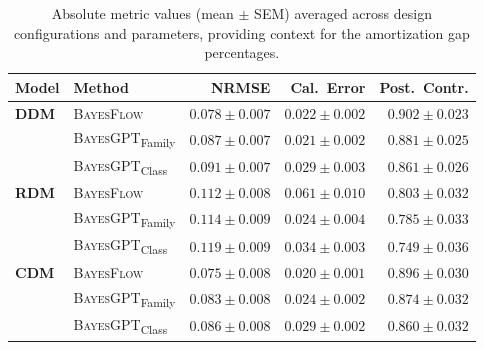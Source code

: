 \begin{table}[ht]
\centering
\small
\caption{Absolute metric values (mean $\pm$ SEM) averaged across design configurations and parameters, providing context for the amortization gap percentages.}
\label{tab:absolute-metrics}
\begin{tabular}{llrrr}
\toprule
\textbf{Model} & \textbf{Method} & NRMSE & Cal.\ Error & Post.\ Contr. \\
\midrule
\textbf{DDM} & \textsc{BayesFlow} & $0.078 \pm 0.007$ & $0.022 \pm 0.002$ & $0.902 \pm 0.023$ \\
 & \textsc{BayesGPT}\textsubscript{Family} & $0.087 \pm 0.007$ & $0.021 \pm 0.002$ & $0.881 \pm 0.025$ \\
 & \textsc{BayesGPT}\textsubscript{Class} & $0.091 \pm 0.007$ & $0.029 \pm 0.003$ & $0.861 \pm 0.026$ \\
\midrule
\textbf{RDM} & \textsc{BayesFlow} & $0.112 \pm 0.008$ & $0.061 \pm 0.010$ & $0.803 \pm 0.032$ \\
 & \textsc{BayesGPT}\textsubscript{Family} & $0.114 \pm 0.009$ & $0.024 \pm 0.004$ & $0.785 \pm 0.033$ \\
 & \textsc{BayesGPT}\textsubscript{Class} & $0.119 \pm 0.009$ & $0.034 \pm 0.003$ & $0.749 \pm 0.036$ \\
\midrule
\textbf{CDM} & \textsc{BayesFlow} & $0.075 \pm 0.008$ & $0.020 \pm 0.001$ & $0.896 \pm 0.030$ \\
 & \textsc{BayesGPT}\textsubscript{Family} & $0.083 \pm 0.008$ & $0.024 \pm 0.002$ & $0.874 \pm 0.032$ \\
 & \textsc{BayesGPT}\textsubscript{Class} & $0.086 \pm 0.008$ & $0.029 \pm 0.002$ & $0.860 \pm 0.032$ \\
\bottomrule
\end{tabular}
\end{table}